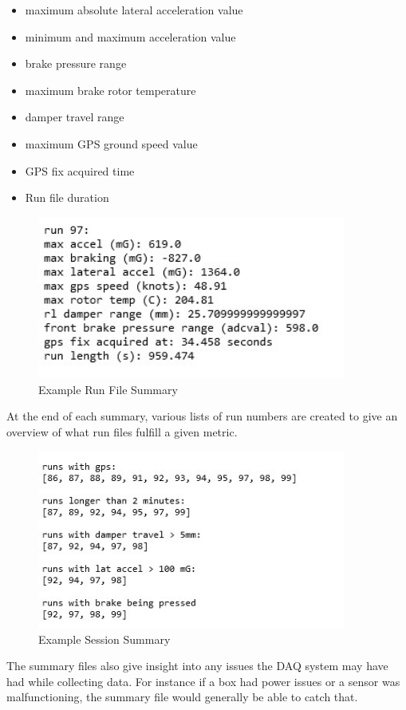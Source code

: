 \begin{itemize}
    \item maximum absolute lateral acceleration value
    \item minimum and maximum acceleration value
    \item brake pressure range
    \item maximum brake rotor temperature
    \item damper travel range
    \item maximum GPS ground speed value
    \item GPS fix acquired time
    \item Run file duration
\end{itemize}
\begin{figure}[H]
    \centering
    \includegraphics[width=4in]{images/summary.jpg}
    \caption{Example Run File Summary}
    \label{fig:sum}
\end{figure}
At the end of each summary, various lists of run numbers are created to give an overview of what run files fulfill a given metric.
\begin{figure}[H]
    \centering
    \includegraphics[width=4in]{images/sessionsumarry.jpg}
    \caption{Example Session Summary}
    \label{fig:sessionsumum}
\end{figure}
The summary files also give insight into any issues the DAQ system may have had while collecting data.
For instance if a box had power issues or a sensor was malfunctioning, the summary file would generally be able to catch that.
